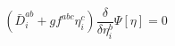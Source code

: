 \begin{equation}
\left(\bar{D}_{i}^{ab} + gf^{abc} \eta_{i}^{c} \right)
\frac{\delta }{\delta \eta_{i}^{b} } \Psi [\eta ] = 0
\label{G4a}
\end{equation} 
